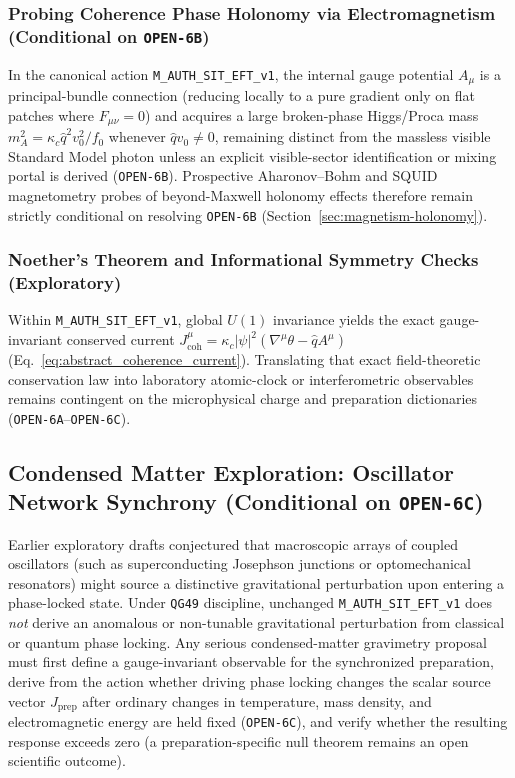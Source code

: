 \subsubsection{Probing Coherence Phase Holonomy via Electromagnetism (Conditional on \texttt{OPEN-6B})}

In the canonical action \texttt{M\_AUTH\_SIT\_EFT\_v1}, the internal gauge potential $A_\mu$ is a principal-bundle connection (reducing locally to a pure gradient only on flat patches where $F_{\mu\nu} = 0$) and acquires a large broken-phase Higgs/Proca mass $m_A^2 = \kappa_c \hat{q}^2 v_0^2 / f_0$ whenever $\hat{q} v_0 \ne 0$, remaining distinct from the massless visible Standard Model photon unless an explicit visible-sector identification or mixing portal is derived (\texttt{OPEN-6B}). Prospective Aharonov--Bohm and SQUID magnetometry probes of beyond-Maxwell holonomy effects therefore remain strictly conditional on resolving \texttt{OPEN-6B} (Section~\ref{sec:magnetism-holonomy}).

\subsubsection{Noether's Theorem and Informational Symmetry Checks (Exploratory)}

Within \texttt{M\_AUTH\_SIT\_EFT\_v1}, global $U(1)$ invariance yields the exact gauge-invariant conserved current $J^\mu_{\mathrm{coh}} = \kappa_c|\psi|^2(\nabla^\mu\theta - \hat{q}A^\mu)$ (Eq.~\eqref{eq:abstract_coherence_current}). Translating that exact field-theoretic conservation law into laboratory atomic-clock or interferometric observables remains contingent on the microphysical charge and preparation dictionaries (\texttt{OPEN-6A}--\texttt{OPEN-6C}).

\subsection{Condensed Matter Exploration: Oscillator Network Synchrony (Conditional on \texttt{OPEN-6C})}

Earlier exploratory drafts conjectured that macroscopic arrays of coupled oscillators (such as superconducting Josephson junctions or optomechanical resonators) might source a distinctive gravitational perturbation upon entering a phase-locked state. Under \texttt{QG49} discipline, unchanged \texttt{M\_AUTH\_SIT\_EFT\_v1} does \emph{not} derive an anomalous or non-tunable gravitational perturbation from classical or quantum phase locking. Any serious condensed-matter gravimetry proposal must first define a gauge-invariant observable for the synchronized preparation, derive from the action whether driving phase locking changes the scalar source vector $J_{\mathrm{prep}}$ after ordinary changes in temperature, mass density, and electromagnetic energy are held fixed (\texttt{OPEN-6C}), and verify whether the resulting response exceeds zero (a preparation-specific null theorem remains an open scientific outcome).


